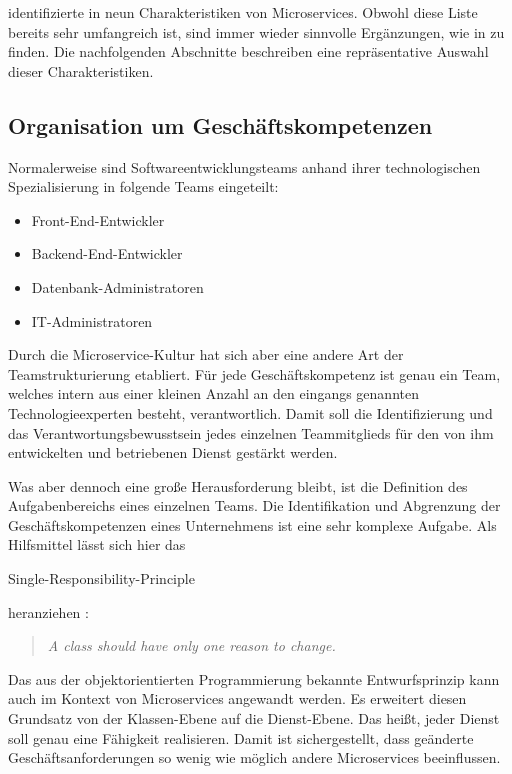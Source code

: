 \citeauthor{FowlerMS} identifizierte in \cite{FowlerMS} neun Charakteristiken von Microservices. Obwohl diese Liste bereits sehr umfangreich ist, sind immer wieder sinnvolle Ergänzungen, wie in \cite{HorsdalMS} zu finden. Die nachfolgenden Abschnitte beschreiben eine repräsentative Auswahl dieser Charakteristiken.

\subsection{Organisation um Geschäftskompetenzen}

Normalerweise sind Softwareentwicklungsteams anhand ihrer technologischen Spezialisierung \zB in folgende Teams eingeteilt:

\begin{itemize}
	\item Front-End-Entwickler
	\item Backend-End-Entwickler
	\item Datenbank-Administratoren
	\item IT-Administratoren
\end{itemize}

Durch die Microservice-Kultur hat sich aber eine andere Art der Teamstrukturierung etabliert. Für jede Geschäftskompetenz ist genau ein Team, welches intern aus einer kleinen Anzahl an den eingangs genannten Technologieexperten besteht, verantwortlich. Damit soll die Identifizierung und das Verantwortungsbewusstsein jedes einzelnen Teammitglieds für den von ihm entwickelten und betriebenen Dienst gestärkt werden.

Was aber dennoch eine große Herausforderung bleibt, ist die Definition des Aufgabenbereichs eines einzelnen Teams. Die Identifikation und Abgrenzung der Geschäftskompetenzen eines Unternehmens ist eine sehr komplexe Aufgabe. Als Hilfsmittel lässt sich hier das \begin{english} Single-Responsibility-Principle\end{english} heranziehen \cite{MartinAgile}: 

\begin{english}
\begin{quote}
  \textit{A class should have only one reason to change.}
\end{quote}
\end{english}

Das aus der objektorientierten Programmierung bekannte Entwurfsprinzip kann auch im Kontext von Microservices angewandt werden. Es erweitert diesen Grundsatz von der Klassen-Ebene auf die Dienst-Ebene. Das heißt, jeder Dienst soll genau eine Fähigkeit realisieren. Damit ist sichergestellt, dass geänderte Geschäftsanforderungen so wenig wie möglich andere Microservices beeinflussen.

